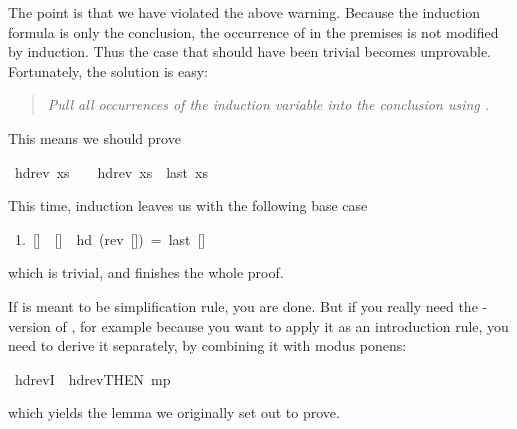 \begin{isabelle}
\begin{isamarkuptxt}
The point is that we have violated the above warning. Because the induction
formula is only the conclusion, the occurrence of  in the premises is
not modified by induction. Thus the case that should have been trivial
becomes unprovable. Fortunately, the solution is easy:
\begin{quote}
\emph{Pull all occurrences of the induction variable into the conclusion
using \isa{\isasymlongrightarrow}.}
\end{quote}
This means we should prove%
\end{isamarkuptxt}%
\ hd{\isacharunderscore}rev{\isacharcolon}\ {\isachardoublequote}xs\ {\isasymnoteq}\ {\isacharbrackleft}{\isacharbrackright}\ {\isasymlongrightarrow}\ hd{\isacharparenleft}rev\ xs{\isacharparenright}\ {\isacharequal}\ last\ xs{\isachardoublequote}%
\begin{isamarkuptext}%
\noindent
This time, induction leaves us with the following base case
\begin{isabellepar}%
\ 1.\ []\ {\isasymnoteq}\ []\ {\isasymlongrightarrow}\ hd\ (rev\ [])\ =\ last\ []
\end{isabellepar}%
which is trivial, and  finishes the whole proof.

If  is meant to be simplification rule, you are done. But if you
really need the \isa{\isasymLongrightarrow}-version of , for
example because you want to apply it as an introduction rule, you need to
derive it separately, by combining it with modus ponens:%
\end{isamarkuptext}%
\ hd{\isacharunderscore}revI\ {\isacharequal}\ hd{\isacharunderscore}rev{\isacharbrackleft}THEN\ mp{\isacharbrackright}%
\begin{isamarkuptext}%
\noindent
which yields the lemma we originally set out to prove.


\end{isamarkuptext}
\end{isabelle}
